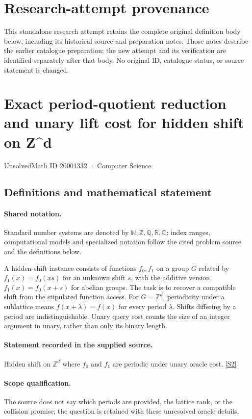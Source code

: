\documentclass[11pt]{article}
\begin{document}
\section*{Research-attempt provenance}
This standalone research attempt retains the complete original definition body below,
including its historical source and preparation notes. Those notes describe the
earlier catalogue preparation; the new attempt and its verification are identified
separately after that body. No original ID, catalogue status, or source statement is changed.

\section{Exact period-quotient reduction and unary lift cost for hidden shift on Z\textasciicircum{}d}\label{20001332}
{\small UnsolvedMath ID 20001332 · Computer Science}
\subsection{Definitions and mathematical statement}

\paragraph{Shared notation.}Standard number systems are denoted by $\mathbb N,\mathbb Z,\mathbb Q,\mathbb R,\mathbb C$; index ranges, computational models and specialized notation follow the cited problem source and the definitions below.


A hidden-shift instance consists of functions $f_0,f_1$ on a group $G$ related by $f_1(x)=f_0(xs)$ for an unknown shift $s$, with the additive version $f_1(x)=f_0(x+s)$ for abelian groups. The task is to recover a compatible shift from the stipulated function access. For $G=\mathbb Z^d$, periodicity under a sublattice means $f(x+\lambda)=f(x)$ for every period $\lambda$. Shifts differing by a period are indistinguishable. Unary query cost counts the size of an integer argument in unary, rather than only its binary length.
\paragraph{Statement recorded in the supplied source.}
Hidden shift on $\mathbb Z^d$ where $f_0$ and $f_1$ are periodic under unary oracle cost. \href{http://aimpl.org/quantumalg/4/}{[S2]}
\paragraph{Scope qualification.}
The source does not say which periods are provided, the lattice rank, or the collision promise; the question is retained with these unresolved oracle details.
\end{document}

